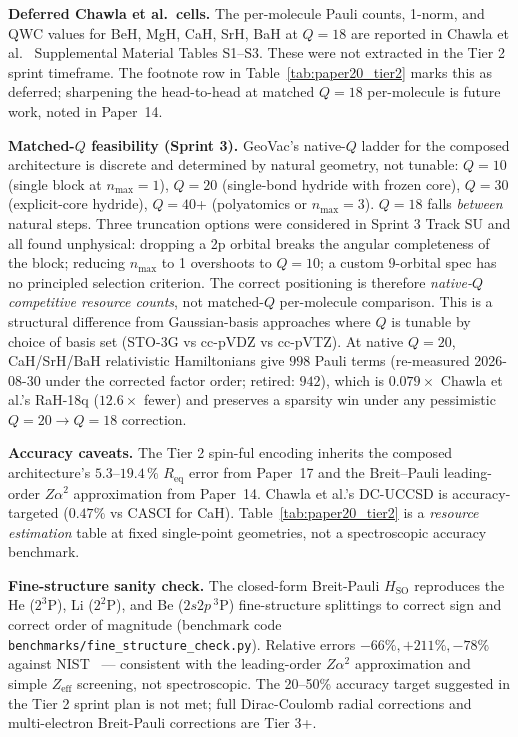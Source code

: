 \documentclass[twocolumn,pra,amsmath,amssymb,superscriptaddress]{revtex4-2}
\newcommand{\gvq}[2]{#2}
\begin{document}
\textbf{Deferred Chawla et al.\ cells.} The per-molecule Pauli counts, 1-norm,
and QWC values for BeH, MgH, CaH, SrH, BaH at $Q = 18$ are reported
in Chawla et al.~\cite{Chawla2024} Supplemental Material Tables
S1--S3. These were not extracted in the Tier 2 sprint timeframe. The
footnote row in Table~\ref{tab:paper20_tier2} marks this as deferred;
sharpening the head-to-head at matched $Q = 18$ per-molecule is
future work, noted in Paper~14.

\textbf{Matched-$Q$ feasibility (Sprint 3).} GeoVac's native-$Q$ ladder
for the composed architecture is discrete and determined by natural
geometry, not tunable: $Q = 10$ (single block at $n_{\max}=1$),
$Q = 20$ (single-bond hydride with frozen core), $Q = 30$
(explicit-core hydride), $Q = 40$+ (polyatomics or $n_{\max}=3$).
$Q = 18$ falls \emph{between} natural steps. Three truncation options
were considered in Sprint 3 Track SU and all found unphysical:
dropping a 2p orbital breaks the angular completeness of the block;
reducing $n_{\max}$ to 1 overshoots to $Q=10$; a custom 9-orbital
spec has no principled selection criterion. The correct positioning
is therefore \emph{native-$Q$ competitive resource counts}, not
matched-$Q$ per-molecule comparison. This is a structural difference
from Gaussian-basis approaches where $Q$ is tunable by choice of
basis set (STO-3G vs cc-pVDZ vs cc-pVTZ). At native $Q=20$,
CaH/SrH/BaH relativistic Hamiltonians give $\gvq{cah_rel_n2_pauli}{998}$ Pauli terms
(re-measured 2026-08-30 under the corrected factor order; retired: $942$),
which is $0.079\times$ Chawla et al.'s RaH-18q ($12.6\times$
fewer) and preserves a sparsity win under any pessimistic $Q=20 \to Q=18$
correction.

\textbf{Accuracy caveats.} The Tier 2 spin-ful encoding inherits the
composed architecture's $5.3$--$19.4\,\%$ $R_{\mathrm{eq}}$ error from
Paper~17 and the Breit--Pauli leading-order $Z\alpha^2$ approximation
from Paper~14. Chawla et al.'s DC-UCCSD is
accuracy-targeted ($0.47\%$ vs CASCI for CaH). Table~\ref{tab:paper20_tier2}
is a \emph{resource estimation} table at fixed single-point
geometries, not a spectroscopic accuracy benchmark.

\textbf{Fine-structure sanity check.} The closed-form Breit-Pauli
$H_{\mathrm{SO}}$ reproduces the He ($2^3$P), Li ($2^2$P), and Be
($2s2p\,^3$P) fine-structure splittings to correct sign and correct
order of magnitude (benchmark code
\texttt{benchmarks/fine\_structure\_check.py}). Relative errors
$-66\%, +211\%, -78\%$ against NIST~\cite{NIST_ASD} --- consistent
with the leading-order $Z\alpha^2$ approximation and simple
$Z_{\mathrm{eff}}$ screening, not spectroscopic. The 20--50\%
accuracy target suggested in the Tier 2 sprint plan is not met; full
Dirac-Coulomb radial corrections and multi-electron Breit-Pauli
corrections are Tier 3+.
\end{document}
